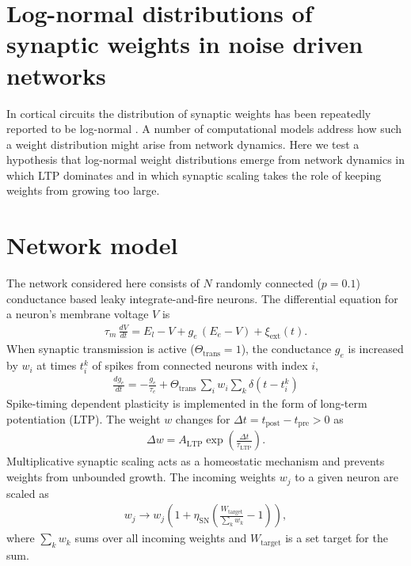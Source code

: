 \columnbreak
\section*{\LARGE Log-normal distributions of synaptic weights in noise driven networks}

In cortical circuits the distribution of synaptic weights has been repeatedly reported to be log-normal \cite{Song2005}. A number of computational models address how such a weight distribution might arise from network dynamics. Here we test a hypothesis that log-normal weight distributions emerge from network dynamics in which LTP dominates and in which synaptic scaling takes the role of keeping weights from growing too large.

\vspace{-0.5cm}

\section*{Network model}

\vspace{-0.5cm}

The network considered here consists of $N$ randomly connected ($p=0.1$) conductance based leaky integrate-and-fire neurons. The differential equation for a neuron's membrane voltage $V$ is
%
\begin{align}
 \tau_m\, \frac{dV}{dt}  = E_l - V + g_e \,(E_e - V) +  \xi_{\mathrm{ext}}(t). \label{eq:mem}
\end{align}
%
When synaptic transmission is active ($\Theta_{\text{trans}}=1$), the conductance $g_e$ is increased by $w_i$ at times $t_i^k$ of spikes from connected neurons with index $i$,
%
\begin{align}
 \frac{d g_e}{dt} = - \frac{g_e}{\tau_e} +  \Theta_{\text{trans}}\, \sum_i w_i \sum_{k} \delta(t-t_i^k)
\end{align}
%
Spike-timing dependent plasticity is implemented in the form of long-term potentiation (LTP). The weight $w$ changes for $\Delta t = t_{\text{post}}-t_{\text{pre}} > 0$ as
\begin{align}
 \Delta w =  A_{\text{LTP}} \exp\left(\frac{\Delta t}{\tau_{\text{LTP}}}\right).
\end{align}
%
Multiplicative synaptic scaling acts as a homeostatic mechanism and prevents weights from unbounded growth. The incoming weights $w_j$ to a given neuron are scaled as
%
\begin{align}
 w_j \to w_j \left(1+ \eta_{\text{SN}} \left( \frac{W_{\text{target}}}{\sum_k w_k} -1\right) \right), \label{eq:sc}
\end{align}
%
where $\sum_k w_k$ sums over all incoming weights and $W_{\text{target}}$ is a set target for the sum.

